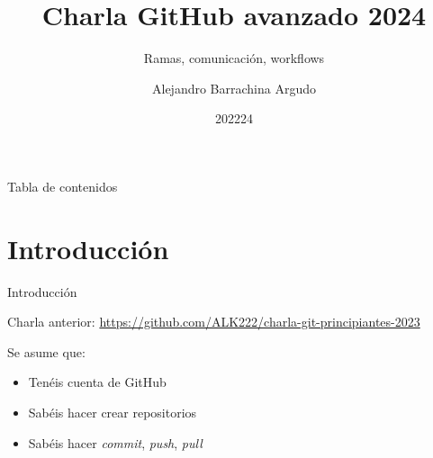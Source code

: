 \documentclass{beamer}
\title{Charla GitHub avanzado 2024}
\subtitle{Ramas, comunicación, workflows}
\date{202224}
\author{Alejandro Barrachina Argudo}
\institute{Universidad Complutense de Madrid}
\begin{document}
\maketitle

\begin{frame}{Tabla de contenidos}
    \tableofcontents
\end{frame}

\section{Introducción}
\begin{frame}{Introducción}

    Charla anterior: \url{https://github.com/ALK222/charla-git-principiantes-2023}
    
    Se asume que:
    \begin{itemize}
        \item Tenéis cuenta de GitHub
        \item Sabéis hacer crear repositorios
        \item Sabéis hacer \textit{commit}, \textit{push}, \textit{pull}
    \end{itemize}
\end{frame}
\end{document}
